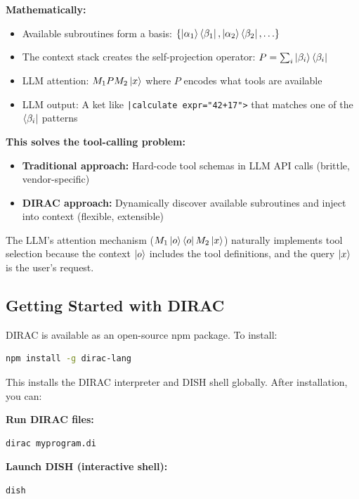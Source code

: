 \documentclass[11pt,a4paper]{article}
\theoremstyle{definition}
\begin{document}
\textbf{Mathematically:}
\begin{itemize}
\item Available subroutines form a basis: $\{\ket{\alpha_1}\bra{\beta_1}, \ket{\alpha_2}\bra{\beta_2}, \ldots\}$
\item The context stack creates the self-projection operator: $P = \sum_i \ket{\beta_i}\bra{\beta_i}$
\item LLM attention: $M_1 P M_2 \ket{x}$ where $P$ encodes what tools are available
\item LLM output: A ket like \texttt{|calculate expr="42+17">} that matches one of the $\bra{\beta_i}$ patterns
\end{itemize}

\textbf{This solves the tool-calling problem:}
\begin{itemize}
\item \textbf{Traditional approach:} Hard-code tool schemas in LLM API calls (brittle, vendor-specific)
\item \textbf{DIRAC approach:} Dynamically discover available subroutines and inject into context (flexible, extensible)
\end{itemize}

The LLM's attention mechanism ($M_1 \ket{o}\bra{o} M_2 \ket{x}$) naturally implements tool selection because the context $\ket{o}$ includes the tool definitions, and the query $\ket{x}$ is the user's request.

\subsection{Getting Started with DIRAC}

DIRAC is available as an open-source npm package. To install:

\begin{lstlisting}[language=bash]
npm install -g dirac-lang
\end{lstlisting}

This installs the DIRAC interpreter and DISH shell globally. After installation, you can:

\textbf{Run DIRAC files:}
\begin{lstlisting}[language=bash]
dirac myprogram.di
\end{lstlisting}

\textbf{Launch DISH (interactive shell):}
\begin{lstlisting}[language=bash]
dish
\end{lstlisting}
\end{document}
